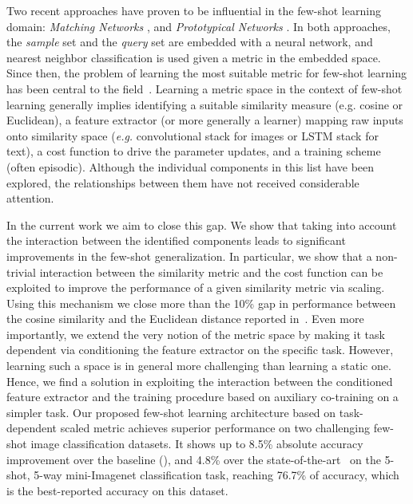 \documentclass{article}
\begin{document}
Two recent approaches have proven to be  influential in the few-shot learning domain: \emph{Matching Networks} \citep{vinyals2016matching}, and \emph{Prototypical Networks} \citep{snell2017prototypical}. In both approaches, the \emph{sample} set and the \emph{query} set are embedded with a neural network, and nearest neighbor classification is used given a metric in the embedded space. Since then, the problem of learning the most suitable metric for few-shot learning has been central to the field~\citep{vinyals2016matching, snell2017prototypical,sung2018learning,munkhdalai2018rapid,mishra2018simle}. Learning a metric space in the context of few-shot learning generally implies identifying a suitable similarity measure (e.g. cosine or Euclidean), a feature extractor (or more generally a learner) mapping raw inputs onto similarity space (\emph{e.g.} convolutional stack for images or LSTM stack for text), a cost function to drive the parameter updates, and a training scheme (often episodic). Although the individual components in this list have been explored, the relationships between them have not received considerable attention.   

In the current work we aim to close this gap. We show that taking into account the interaction between the identified components leads to significant improvements in the few-shot generalization. In particular, we show that a non-trivial interaction between the similarity metric and the cost function can be exploited to improve the performance of a given similarity metric via scaling. Using this mechanism we close more than the 10\% gap in performance between the cosine similarity and the Euclidean distance reported in~\citep{snell2017prototypical}. Even more importantly, we extend the very notion of the metric space by making it task dependent via conditioning the feature extractor on the specific task. However, learning such a space is in general more challenging than learning a static one. Hence, we find a solution in exploiting the interaction between the conditioned feature extractor and the training procedure based on auxiliary co-training on a simpler task. Our proposed few-shot learning architecture based on task-dependent scaled metric achieves superior performance on two challenging few-shot image classification datasets. It shows up to 8.5\% absolute accuracy improvement over the baseline (\citet{snell2017prototypical}), and 4.8\% over the state-of-the-art~\citep{munkhdalai2018rapid} on the 5-shot, 5-way mini-Imagenet classification task, reaching 76.7\% of accuracy, which is the best-reported accuracy on this dataset.
\end{document}
